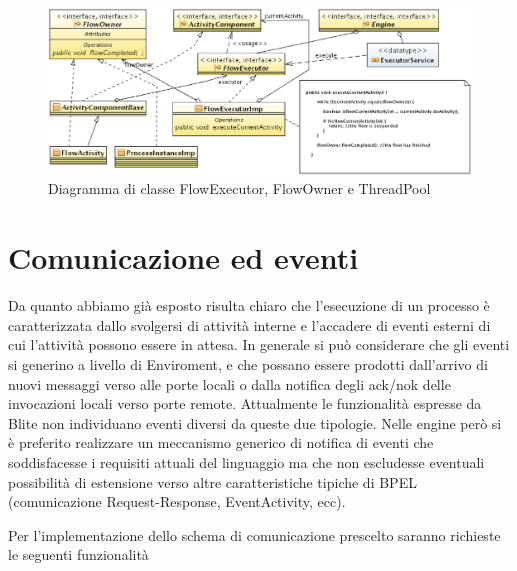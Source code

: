 \begin{figure}[p]
\begin{center}
\includegraphics[angle=90,scale=0.75]
{architettura_interna/dia/flowClassDiagram}
\caption[Diagramma di classe FlowExecutor \ldots] {
   	\textsf{{\small Diagramma di classe FlowExecutor, FlowOwner e ThreadPool}} }
  \label{fig:flowclass}
\end{center}
\end{figure}

\section{Comunicazione ed eventi}
Da quanto abbiamo già esposto risulta chiaro che l'esecuzione di un processo \`e
caratterizzata dallo svolgersi di attività interne e l'accadere di eventi
esterni di cui l'attività possono essere in attesa. In generale si può
considerare che gli eventi si generino a livello di Enviroment, e che possano
essere prodotti dall'arrivo di nuovi messaggi verso alle porte locali o
dalla notifica degli ack/nok delle invocazioni locali
verso porte remote. Attualmente le funzionalità espresse da Blite non
individuano eventi diversi da queste due tipologie. Nelle engine però si \`e
preferito realizzare un meccanismo generico di notifica di eventi che
soddisfacesse i requisiti attuali del linguaggio ma che non escludesse eventuali
possibilità di estensione verso altre caratteristiche tipiche di BPEL
(comunicazione Request-Response, EventActivity, ecc).

Per l'implementazione dello schema di comunicazione prescelto saranno richieste
le seguenti funzionalità

